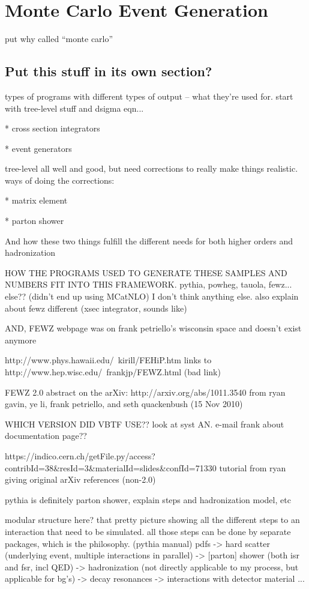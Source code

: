 \section{Monte Carlo Event Generation}
\label{sim:MC}
put why called ``monte carlo''

\subsection{Put this stuff in its own section?}
\label{sim:MCexplain}

types of programs with different types of output -- what they're used for. 
start with tree-level stuff and dsigma eqn...

   * cross section integrators

   * event generators

tree-level all well and good, but need corrections to really 
make things realistic.  
ways of doing the corrections:

   * matrix element

   * parton shower

And how these two things fulfill the different needs for 
both higher orders and hadronization

HOW THE PROGRAMS USED TO GENERATE THESE SAMPLES AND NUMBERS 
FIT INTO THIS FRAMEWORK.  
   pythia, powheg, tauola, fewz... else??  (didn't end up using MCatNLO) 
I don't think anything else.  
also explain about fewz different (xsec integrator, sounds like)

AND, FEWZ webpage was on frank petriello's wisconsin space and doesn't exist anymore

http://www.phys.hawaii.edu/~kirill/FEHiP.htm links to 
http://www.hep.wisc.edu/~frankjp/FEWZ.html (bad link)

FEWZ 2.0 abstract on the arXiv: http://arxiv.org/abs/1011.3540 
from ryan gavin, ye li, frank petriello, and seth quackenbush (15 Nov 2010)

WHICH VERSION DID VBTF USE??  look at syst AN.  
e-mail frank about documentation page??

https://indico.cern.ch/getFile.py/access?contribId=38\&resId=3\&materialId=slides\&confId=71330  tutorial from ryan giving original arXiv references (non-2.0)

pythia is definitely parton shower, 
explain steps and hadronization model, etc

modular structure here?  that pretty picture showing all the 
different steps to an interaction that need to be 
simulated. 
all those steps can be done by separate packages, 
which is the philosophy.  (pythia manual)
pdfs ->
hard scatter (underlying event, multiple interactions in parallel) ->
[parton] shower (both isr and fsr, incl QED) ->
hadronization (not directly applicable to my process, but applicable for bg's) -> 
decay resonances -> interactions with detector material ...


